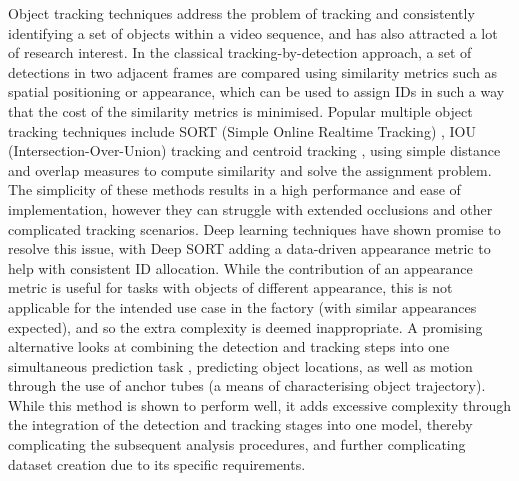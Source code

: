 \documentclass[10pt]{article}
\begin{document}
Object tracking techniques address the problem of tracking and consistently identifying a set of objects within a video sequence, and has also attracted a lot of research interest. In the classical tracking-by-detection approach, a set of detections in two adjacent frames are compared using similarity metrics such as spatial positioning or appearance, which can be used to assign IDs in such a way that the cost of the similarity metrics is minimised. Popular multiple object tracking techniques include SORT (Simple Online Realtime Tracking) \cite{bewley2016simple}, IOU (Intersection-Over-Union) tracking \cite{bochinski2017high} and centroid tracking \cite{nascimento1999algorithm}, using simple distance and overlap measures to compute similarity and solve the assignment problem. The simplicity of these methods results in a high performance and ease of implementation, however they can struggle with extended occlusions and other complicated tracking scenarios. Deep learning techniques have shown promise to resolve this issue, with Deep SORT \cite{wojke2017simple} adding a data-driven appearance metric to help with consistent ID allocation. While the contribution of an appearance metric is useful for tasks with objects of different appearance, this is not applicable for the intended use case in the factory (with similar appearances expected), and so the extra complexity is deemed inappropriate. A promising alternative looks at combining the detection and tracking steps into one simultaneous prediction task \cite{sun2020simultaneous}, predicting object locations, as well as motion through the use of anchor tubes (a means of characterising object trajectory). While this method is shown to perform well, it adds excessive complexity through the integration of the detection and tracking stages into one model, thereby complicating the subsequent analysis procedures, and further complicating dataset creation due to its specific requirements.
\end{document}

